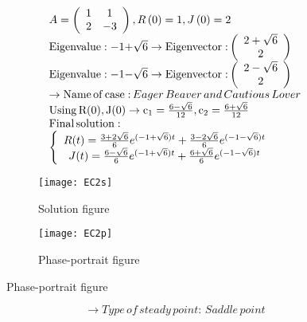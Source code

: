 \documentclass[a4paper]{article}
\begin{document}
\[\begin{array}{l}
A = \left( {\begin{array}{*{20}{c}}
1&1\\
2&{ - 3}
\end{array}} \right),R\left( 0 \right) = 1,J\left( 0 \right) = 2\\
{\rm{Eigenvalue: - 1 + }}\sqrt 6  \to {\rm{Eigenvector:}}\left( {\begin{array}{*{20}{c}}
{2 + \sqrt 6 }\\
2
\end{array}} \right)\\
{\rm{Eigenvalue: - 1 - }}\sqrt 6  \to {\rm{Eigenvector:}}\left( {\begin{array}{*{20}{c}}
{2 - \sqrt 6 }\\
2
\end{array}} \right)\\
 \to {\rm{Name}}\,{\rm{of}}\,{\rm{case:}}\,Eager\,Beaver\,and\,Cautious\,Lover\\
{\rm{Using}}\,{\rm{R(0), J(0)}} \to {{\rm{c}}_1} = \frac{{6 - \sqrt 6 }}{{12}},{\rm{ }}{{\rm{c}}_2} = \frac{{6 + \sqrt 6 }}{{12}}\\
{\rm{Final}}\,{\rm{solution:}}\\
\left\{ {\begin{array}{*{20}{c}}
{R(t) = \frac{{3 + 2\sqrt 6 }}{6}{e^{{\rm{( - 1 + }}\sqrt 6 )t}} + \frac{{3 - 2\sqrt 6 }}{6}{e^{{\rm{( - 1 - }}\sqrt 6 )t}}}\\
{J(t) = \frac{{6 - \sqrt 6 }}{6}{e^{{\rm{( - 1 + }}\sqrt 6 )t}} + \frac{{6 + \sqrt 6 }}{6}{e^{{\rm{( - 1 - }}\sqrt 6 )t}}}
\end{array}} \right.
\end{array}\]
\begin{figure}[H]
\centering
\begin{subfigure}{.5\textwidth}
  \centering
  \texttt{[image: EC2s]}
  \caption*{Solution figure}
\end{subfigure}%
\begin{subfigure}{.5\textwidth}
  \centering
  \texttt{[image: EC2p]}
  \caption*{Phase-portrait figure}
\end{subfigure}
\end{figure}
\[  \to  Type\,of\,steady\,point:\,Saddle\,point\]
\end{document}
